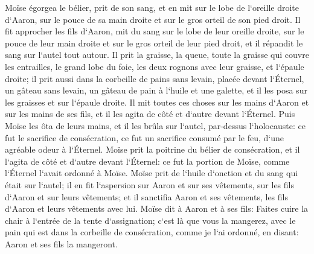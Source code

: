 \verse Moïse égorgea le bélier, prit de son sang, et en mit sur le lobe de l`oreille droite d`Aaron, sur le pouce de sa main droite et sur le gros orteil de son pied droit. 
\verse Il fit approcher les fils d`Aaron, mit du sang sur le lobe de leur oreille droite, sur le pouce de leur main droite et sur le gros orteil de leur pied droit, et il répandit le sang sur l`autel tout autour. 
\verse Il prit la graisse, la queue, toute la graisse qui couvre les entrailles, le grand lobe du foie, les deux rognons avec leur graisse, et l`épaule droite; 
\verse il prit aussi dans la corbeille de pains sans levain, placée devant l`Éternel, un gâteau sans levain, un gâteau de pain à l`huile et une galette, et il les posa sur les graisses et sur l`épaule droite. 
\verse Il mit toutes ces choses sur les mains d`Aaron et sur les mains de ses fils, et il les agita de côté et d`autre devant l`Éternel. 
\verse Puis Moïse les ôta de leurs mains, et il les brûla sur l`autel, par-dessus l`holocauste: ce fut le sacrifice de consécration, ce fut un sacrifice consumé par le feu, d`une agréable odeur à l`Éternel. 
\verse Moïse prit la poitrine du bélier de consécration, et il l`agita de côté et d`autre devant l`Éternel: ce fut la portion de Moïse, comme l`Éternel l`avait ordonné à Moïse. 
\verse Moïse prit de l`huile d`onction et du sang qui était sur l`autel; il en fit l`aspersion sur Aaron et sur ses vêtements, sur les fils d`Aaron et sur leurs vêtements; et il sanctifia Aaron et ses vêtements, les fils d`Aaron et leurs vêtements avec lui. 
\verse Moïse dit à Aaron et à ses fils: Faites cuire la chair à l`entrée de la tente d`assignation; c`est là que vous la mangerez, avec le pain qui est dans la corbeille de consécration, comme je l`ai ordonné, en disant: Aaron et ses fils la mangeront. 
